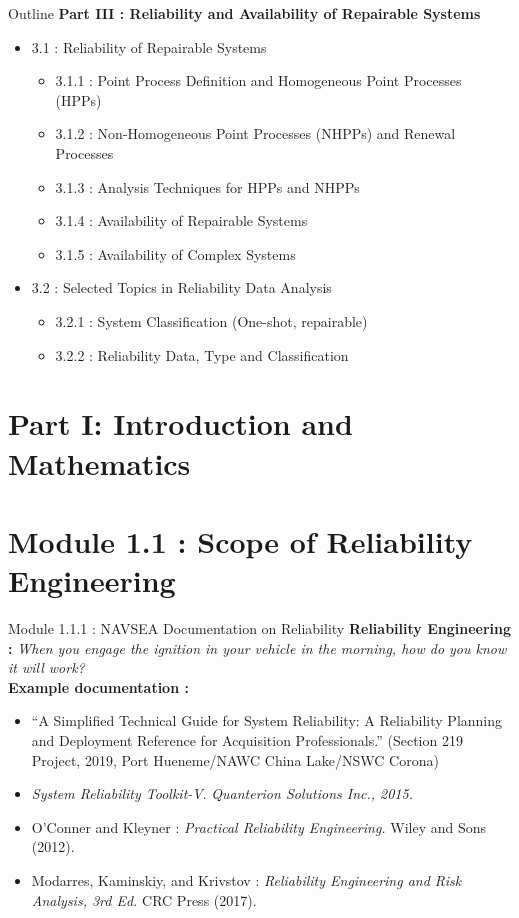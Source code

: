 \documentclass{beamer}
\begin{document}
\begin{frame}{Outline}
\small
\textbf{Part III : Reliability and Availability of Repairable Systems}
\begin{itemize}
\item 3.1 : Reliability of Repairable Systems
\begin{itemize}
\item 3.1.1 : Point Process Definition and Homogeneous Point Processes (HPPs)
\item 3.1.2 : Non-Homogeneous Point Processes (NHPPs) and Renewal Processes
\item 3.1.3 : Analysis Techniques for HPPs and NHPPs
\item 3.1.4 : Availability of Repairable Systems
\item 3.1.5 : Availability of Complex Systems
\end{itemize}
\item 3.2 : Selected Topics in Reliability Data Analysis
\begin{itemize}
\item 3.2.1 : System Classification (One-shot, repairable)
\item 3.2.2 : Reliability Data, Type and Classification
\end{itemize}
\end{itemize}
\end{frame}

\section{Part I: Introduction and Mathematics}

\section{Module 1.1 : Scope of Reliability Engineering}

\begin{frame}{Module 1.1.1 :  NAVSEA Documentation on Reliability}
\textbf{Reliability Engineering : } \textit{When you engage the ignition in your vehicle in the morning, how do you know it will work?} \\ \vspace{0.5cm}
\small
\textbf{Example documentation : }
\begin{itemize}
\item ``A Simplified Technical Guide for System Reliability: A Reliability Planning and Deployment Reference for Acquisition Professionals.'' (Section 219 Project, 2019, Port Hueneme/NAWC China Lake/NSWC Corona)
\item \textit{System Reliability Toolkit-V}. \textit{Quanterion Solutions Inc., 2015.}
\item O'Conner and Kleyner : \textit{Practical Reliability Engineering.} Wiley and Sons (2012).
\item Modarres, Kaminskiy, and Krivstov : \textit{Reliability Engineering and Risk Analysis, 3rd Ed.} CRC Press (2017). 
\end{itemize}
\end{frame}
\end{document}
